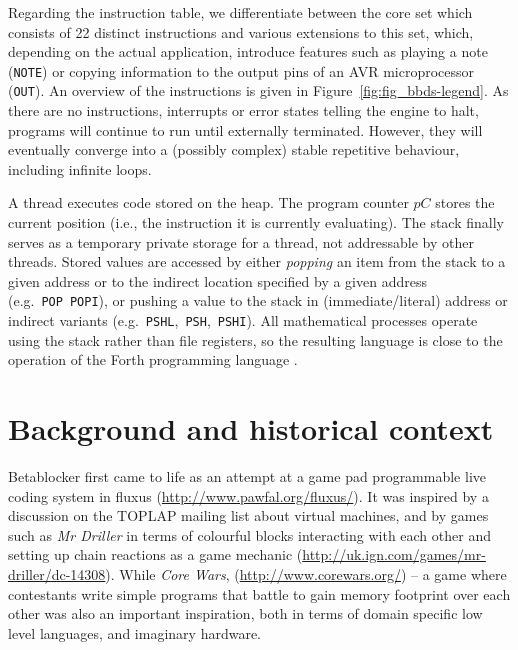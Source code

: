\documentclass[letterpaper, 12pt]{article}
\begin{document}
Regarding the instruction table, we differentiate between the core set which consists of 22 distinct instructions and various extensions to this set, which, depending on the actual application, introduce features such as playing a note (\texttt{NOTE}) or copying information to the output pins of an AVR microprocessor (\texttt{OUT}).
An overview of the instructions is given in Figure~\ref{fig:fig_bbds-legend}.
As there are no instructions, interrupts or error states telling the engine to halt, programs will continue to run until externally terminated.
However, they will eventually converge into a (possibly complex) stable repetitive behaviour, including infinite loops.

A thread executes code stored on the heap.
The program counter $pC$ stores the current position (i.e., the instruction it is currently evaluating).
The stack finally serves as a temporary private storage for a thread, not addressable by other threads.
Stored values are accessed by either \emph{popping} an item from the stack to a given address or to the indirect location specified by a given address (e.g.~\texttt{POP}~\texttt{POPI}), or pushing a value to the stack in (immediate/literal) address or indirect variants  (e.g.~\texttt{PSHL},~\texttt{PSH},~\texttt{PSHI}). All mathematical processes operate using the stack rather than file registers, so the resulting language is close to the operation of the Forth programming language \citep{rather1993-the}.
\parskip 18pt

\section{Background and historical context}
\label{sec:background}


Betablocker first came to life as an attempt at a game pad programmable live coding system in fluxus (\url{http://www.pawfal.org/fluxus/}).
It was inspired by a discussion on the TOPLAP mailing list about virtual machines, and by games such as \emph{Mr Driller} in terms of colourful blocks interacting with each other and setting up chain reactions as a game mechanic (\url{http://uk.ign.com/games/mr-driller/dc-14308}). 
While
\emph{Core Wars}, (\url{http://www.corewars.org/}) -- a game where contestants write simple programs that battle to gain memory footprint over each other was also an important inspiration, both in terms of domain specific low level languages, and imaginary hardware.
\end{document}
